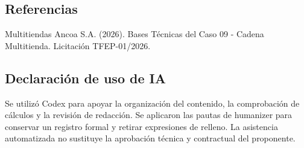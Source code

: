 \documentclass[11pt]{article}
\begin{document}
\subsection*{Referencias}

Multitiendas Ancoa S.A. (2026). Bases Técnicas del Caso 09 - Cadena Multitienda. Licitación TFEP-01/2026.

\subsection*{Declaración de uso de IA}

Se utilizó Codex para apoyar la organización del contenido, la comprobación de cálculos y la revisión de redacción. Se aplicaron las pautas de humanizer para conservar un registro formal y retirar expresiones de relleno. La asistencia automatizada no sustituye la aprobación técnica y contractual del proponente.
\end{document}
